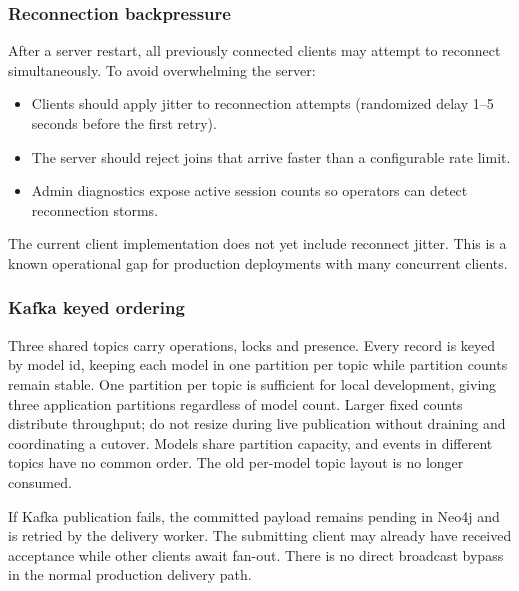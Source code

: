 \subsubsection{Reconnection backpressure}

After a server restart, all previously connected clients may attempt to
reconnect simultaneously. To avoid overwhelming the server:

\begin{itemize}
\item Clients should apply jitter to reconnection attempts (randomized delay
  1--5 seconds before the first retry).
\item The server should reject joins that arrive faster than a configurable
  rate limit.
\item Admin diagnostics expose active session counts so operators can detect
  reconnection storms.
\end{itemize}

The current client implementation does not yet include reconnect jitter. This
is a known operational gap for production deployments with many concurrent
clients.

\subsubsection{Kafka keyed ordering}

Three shared topics carry operations, locks and presence. Every record is
keyed by model id, keeping each model in one partition per topic while
partition counts remain stable. One partition per topic is sufficient for
local development, giving three application partitions regardless of model
count. Larger fixed counts distribute throughput; do not resize during live
publication without draining and coordinating a cutover. Models share
partition capacity, and events in different topics have no common order.
The old per-model topic layout is no longer consumed.

If Kafka publication fails, the committed payload remains pending in Neo4j
and is retried by the delivery worker. The submitting client may already have
received acceptance while other clients await fan-out. There is no direct
broadcast bypass in the normal production delivery path.
